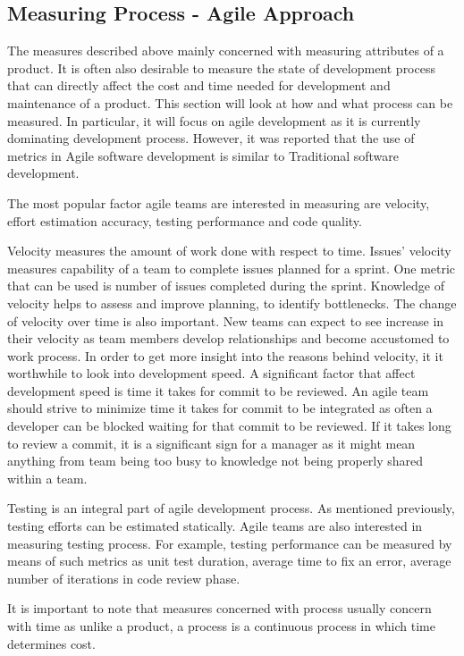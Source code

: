 \documentclass[11pt]{article}
\begin{document}
\subsection{Measuring Process - Agile Approach}
\label{sec:Mesuring-Process}
The measures described above mainly concerned with measuring attributes of a product. It is often also desirable to measure the state of development process that can directly affect the cost and time needed for development and maintenance of a product. This section will look at how and what process can be measured. In particular, it will focus on agile development as it is currently dominating development process. However, it was reported that the use of metrics in Agile software development is similar to Traditional software development.\cite{Kupiainen:2015:UMA:2784072.2784627}
\par 
The most popular factor agile teams are interested in measuring are velocity, effort estimation accuracy, testing performance and code quality.
\par
Velocity measures the amount of work done with respect to time. Issues' velocity measures capability of a team to complete issues planned for a sprint. One metric that can be used is number of issues completed during the sprint. Knowledge of velocity helps to assess and improve planning, to identify bottlenecks.\cite{Agile-case-study-finland} The change of velocity over time is also important. New teams can expect to see increase in their velocity as team members develop relationships and become accustomed to work process.
In order to get more insight into the reasons behind velocity, it it worthwhile to look into development speed. A significant factor that affect development speed is time it takes for commit to be reviewed. An agile team should strive to minimize time it takes for commit to be integrated as often a developer can be blocked waiting for that commit to be reviewed. If it takes long to review a commit, it is a significant sign for a manager as it might mean anything from team being too busy to knowledge not being properly shared within a team.
\par 
Testing is an integral part of agile development process. As mentioned previously, testing efforts can be estimated statically. Agile teams are also interested in measuring testing process. For example, testing performance can be measured by means of such metrics as unit test duration, average time to fix an error, average number of iterations in code review phase.
\par 
It is important to note that measures concerned with process usually concern with time as unlike a product, a process is a continuous process in which time determines cost.
\end{document}
